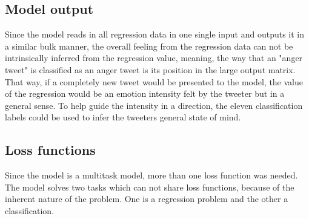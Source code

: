 \subsection{Model output}
Since the model reads in all regression data in one single input and outputs it in a similar bulk manner, the overall feeling from the regression data can not be intrinsically inferred from the regression value, meaning, the way that an "anger tweet" is classified as an anger tweet is its position in the large output matrix. That way, if a completely new tweet would be presented to the model, the value of the regression would be an emotion intensity felt by the tweeter but in a general sense. To help guide the intensity in a direction, the eleven classification labels could be used to infer the tweeters general state of mind. 

\subsection{Loss functions}
Since the model is a multitask model, more than one loss function was needed. The model solves two tasks which can not share loss functions, because of the inherent nature of the problem. One is a regression problem and the other a classification.

